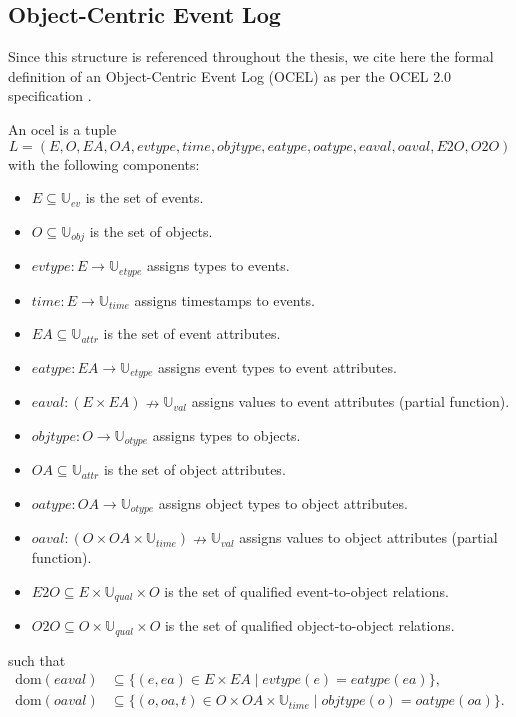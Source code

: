 \subsection{Object-Centric Event Log}\label{ssec:ocel}

Since this structure is referenced throughout the thesis, we cite here the formal definition of an Object-Centric Event Log (OCEL) as per the OCEL 2.0 specification \autocite{DBLP:journals/corr/abs-2403-01975}.

\begin{definition}[\ac{ocel}]\label{def:ocel}
An \ac{ocel} is a tuple
\[
L = (E, O, EA, OA, \mathit{evtype}, \mathit{time}, \mathit{objtype}, \mathit{eatype}, \mathit{oatype}, \mathit{eaval}, \mathit{oaval}, E2O, O2O)
\]
with the following components:
\begin{itemize}
  \item $E \subseteq \mathbb{U}_{ev}$ is the set of events.
  \item $O \subseteq \mathbb{U}_{obj}$ is the set of objects.
  \item $\mathit{evtype}: E \rightarrow \mathbb{U}_{etype}$ assigns types to events.
  \item $\mathit{time}: E \rightarrow \mathbb{U}_{time}$ assigns timestamps to events.
  \item $EA \subseteq \mathbb{U}_{attr}$ is the set of event attributes.
  \item $\mathit{eatype}: EA \rightarrow \mathbb{U}_{etype}$ assigns event types to event attributes.
  \item $\mathit{eaval}: (E \times EA) \nrightarrow \mathbb{U}_{val}$ assigns values to event attributes (partial function).
  \item $\mathit{objtype}: O \rightarrow \mathbb{U}_{otype}$ assigns types to objects.
  \item $OA \subseteq \mathbb{U}_{attr}$ is the set of object attributes.
  \item $\mathit{oatype}: OA \rightarrow \mathbb{U}_{otype}$ assigns object types to object attributes.
  \item $\mathit{oaval}: (O \times OA \times \mathbb{U}_{time}) \nrightarrow \mathbb{U}_{val}$ assigns values to object attributes (partial function).
  \item $E2O \subseteq E \times \mathbb{U}_{qual} \times O$ is the set of qualified event-to-object relations.
  \item $O2O \subseteq O \times \mathbb{U}_{qual} \times O$ is the set of qualified object-to-object relations.
\end{itemize}

such that
\begin{align*}
  \text{dom}(\mathit{eaval}) &\subseteq \{ (e, ea) \in E \times EA \mid \mathit{evtype}(e) = \mathit{eatype}(ea) \}, \\
  \text{dom}(\mathit{oaval}) &\subseteq \{ (o, oa, t) \in O \times OA \times \mathbb{U}_{time} \mid \mathit{objtype}(o) = \mathit{oatype}(oa) \}.
\end{align*}
\end{definition}

